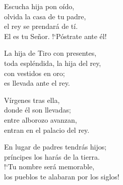 \documentclass[12pt, letterpaper]{report}
\begin{document}
    \noindent
    Escucha hija pon o\'ido,\\
    olvida la casa de tu padre,\\
    el rey se prendar\'a de t\'i.\\
    El es tu Se\~nor. !`P\'ostrate ante \'el!

    \noindent
    La hija de Tiro con presentes,\\
    toda espl\'endida, la hija del rey,\\
    con vestidos en oro;\\
    es llevada ante el rey.

    \noindent
    V\'irgenes tras ella,\\
    donde \'el son llevadas;\\
    entre alborozo avanzan,\\
    entran en el palacio del rey.

    \noindent
    En lugar de padres tendr\'as hijos;\\
    pr\'incipes los har\'as de la tierra.\\
    !`Tu nombre ser\'a memorable,\\
    los pueblos te alabaran por los siglos!
    \clearpage




\end{document}
